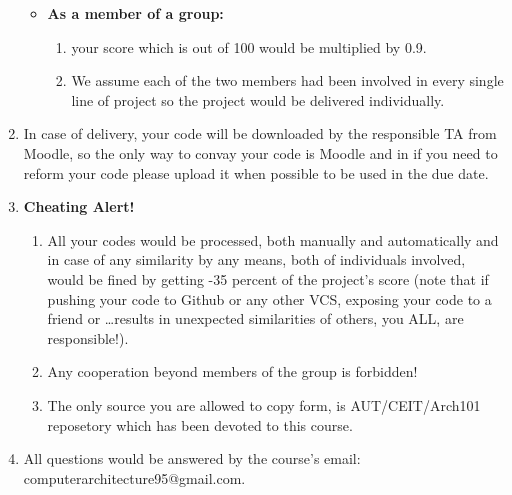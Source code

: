 \documentclass{report}
\begin{document}
\begin{enumerate}
\begin{itemize}
\begin{enumerate}
                    \end{enumerate}
                \item \textbf{As a member of a group:}
                    \begin{enumerate}
                        \item 
                            your score which is out of 100 would be multiplied by 0.9.
                        \item
                            We assume each of the two members had been involved in every single line of project so the project would be delivered individually.
                    \end{enumerate}
            \end{itemize}

        \item
            In case of delivery, your code will be downloaded by the responsible TA from Moodle, so the only way to convay your code is Moodle and in if you need to reform your code please upload it when possible to be used in the due date.
        \item
            \textbf{Cheating Alert!}
                    \begin{enumerate}
                        \item 
                            All your codes would be processed, both manually and automatically and in case of any similarity by any means, both of individuals involved, would be fined by getting -35 percent of the project's score (note that if pushing your code to Github or any other VCS, exposing your code to a friend or \ldots results in unexpected similarities of others, you ALL, are responsible!).
                        \item 
                            Any cooperation beyond members of the group is forbidden!
                        \item
                            The only source you are allowed to copy form, is AUT/CEIT/Arch101 reposetory which has been devoted to this course.
                    \end{enumerate}
                \item All questions would be answered by the course's email: computerarchitecture95@gmail.com.
    \end{enumerate}
\end{document}
